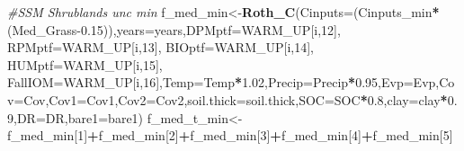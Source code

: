 \documentclass[
  10pt,
  b5paper,
]{book}
\newenvironment{Shaded}{\begin{snugshade}}{\end{snugshade}}
\newcommand{\CommentTok}[1]{\textcolor[rgb]{0.56,0.35,0.01}{\textit{#1}}}
\newcommand{\DataTypeTok}[1]{\textcolor[rgb]{0.13,0.29,0.53}{#1}}
\newcommand{\DecValTok}[1]{\textcolor[rgb]{0.00,0.00,0.81}{#1}}
\newcommand{\FloatTok}[1]{\textcolor[rgb]{0.00,0.00,0.81}{#1}}
\newcommand{\KeywordTok}[1]{\textcolor[rgb]{0.13,0.29,0.53}{\textbf{#1}}}
\newcommand{\NormalTok}[1]{#1}
\newcommand{\OperatorTok}[1]{\textcolor[rgb]{0.81,0.36,0.00}{\textbf{#1}}}
\begin{document}
\begin{Shaded}
\begin{Highlighting}[]
\CommentTok{#SSM Shrublands unc min}
\NormalTok{f_med_min<-}\KeywordTok{Roth_C}\NormalTok{(}\DataTypeTok{Cinputs=}\NormalTok{(Cinputs_min}\OperatorTok{*}\NormalTok{(Med_Grass}\FloatTok{-0.15}\NormalTok{)),}\DataTypeTok{years=}\NormalTok{years,}\DataTypeTok{DPMptf=}\NormalTok{WARM_UP[i,}\DecValTok{12}\NormalTok{], }\DataTypeTok{RPMptf=}\NormalTok{WARM_UP[i,}\DecValTok{13}\NormalTok{], }\DataTypeTok{BIOptf=}\NormalTok{WARM_UP[i,}\DecValTok{14}\NormalTok{], }\DataTypeTok{HUMptf=}\NormalTok{WARM_UP[i,}\DecValTok{15}\NormalTok{], }\DataTypeTok{FallIOM=}\NormalTok{WARM_UP[i,}\DecValTok{16}\NormalTok{],}\DataTypeTok{Temp=}\NormalTok{Temp}\OperatorTok{*}\FloatTok{1.02}\NormalTok{,}\DataTypeTok{Precip=}\NormalTok{Precip}\OperatorTok{*}\FloatTok{0.95}\NormalTok{,}\DataTypeTok{Evp=}\NormalTok{Evp,}\DataTypeTok{Cov=}\NormalTok{Cov,}\DataTypeTok{Cov1=}\NormalTok{Cov1,}\DataTypeTok{Cov2=}\NormalTok{Cov2,}\DataTypeTok{soil.thick=}\NormalTok{soil.thick,}\DataTypeTok{SOC=}\NormalTok{SOC}\OperatorTok{*}\FloatTok{0.8}\NormalTok{,}\DataTypeTok{clay=}\NormalTok{clay}\OperatorTok{*}\FloatTok{0.9}\NormalTok{,}\DataTypeTok{DR=}\NormalTok{DR,}\DataTypeTok{bare1=}\NormalTok{bare1)}
\NormalTok{f_med_t_min<-f_med_min[}\DecValTok{1}\NormalTok{]}\OperatorTok{+}\NormalTok{f_med_min[}\DecValTok{2}\NormalTok{]}\OperatorTok{+}\NormalTok{f_med_min[}\DecValTok{3}\NormalTok{]}\OperatorTok{+}\NormalTok{f_med_min[}\DecValTok{4}\NormalTok{]}\OperatorTok{+}\NormalTok{f_med_min[}\DecValTok{5}\NormalTok{]}


\end{Highlighting}
\end{Shaded}
\end{document}
